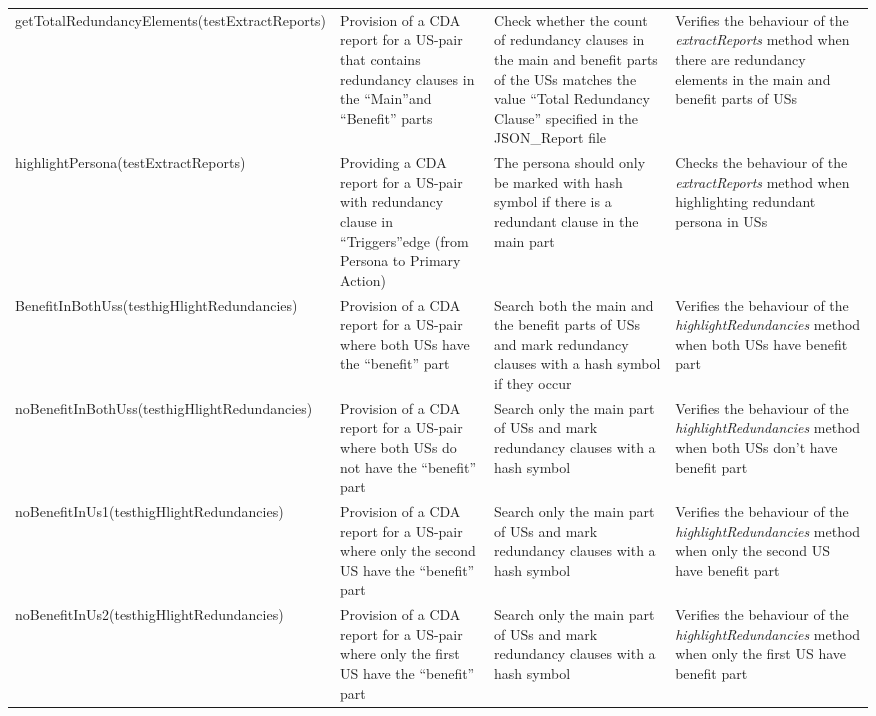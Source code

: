 \begin{tabularx}{\textwidth}{X  X  X  X}
			getTotalRedundancy\newline Elements\newline(testExtractReports)&Provision of a CDA report for a US-pair that contains redundancy clauses in the \enquote{Main}and \enquote{Benefit} parts&Check whether the count of redundancy clauses in the main and benefit parts of the USs matches the value \enquote{Total Redundancy Clause} specified in the JSON\_Report file&Verifies the behaviour of the \textit{extractReports} method when there are redundancy elements in the main and benefit parts of USs\\
			
			highlightPersona\newline(testExtractReports)&Providing a CDA report for a US-pair with redundancy clause in \enquote{Triggers}edge (from Persona to Primary Action)&The persona should only be marked with hash symbol if there is a redundant clause in the main part&Checks the behaviour of the \textit{extractReports} method when highlighting redundant persona in USs\\
				
			BenefitInBothUss\newline(testhigHlightRedundancies)&Provision of a CDA report for a US-pair where both USs have the \enquote{benefit} part&Search both the main and the benefit parts of USs and mark redundancy clauses with a hash symbol if they occur&Verifies the behaviour of the \textit{highlightRedundancies} method when both USs have benefit part\\
			
			noBenefitInBothUss\newline(testhigHlightRedundancies)&Provision of a CDA report for a US-pair where both USs do not have the \enquote{benefit} part&Search only the main part of USs and mark redundancy clauses with a hash symbol&Verifies the behaviour of the \textit{highlightRedundancies} method when both USs don't have benefit part\\
			
			noBenefitInUs1\newline(testhigHlightRedundancies)&Provision of a CDA report for a US-pair where only the second US have the \enquote{benefit} part&Search only the main part of USs and mark redundancy clauses with a hash symbol&Verifies the behaviour of the \textit{highlightRedundancies} method when only the second US have benefit part\\
			
			noBenefitInUs2\newline(testhigHlightRedundancies)&Provision of a CDA report for a US-pair where only the first US have the \enquote{benefit} part&Search only the main part of USs and mark redundancy clauses with a hash symbol&Verifies the behaviour of the \textit{highlightRedundancies} method when only the first US have benefit part\\
			

\end{tabularx}

